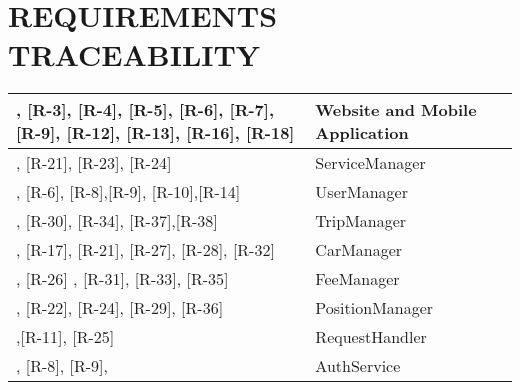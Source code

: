 \section{REQUIREMENTS TRACEABILITY}

	\begin{center}
	\begin{adjustbox}{max width=\textwidth}	
		\begin{tabular}{|l|>{\raggedright}p{5cm}|}
		\hline  [R-2], [R-3], [R-4], [R-5], [R-6], [R-7], [R-9], [R-12], [R-13], [R-16], [R-18]    & Website and Mobile Application \tabularnewline
		 \hline [R-15], [R-21], [R-23], [R-24] & ServiceManager \tabularnewline
		\hline  [R-1], [R-6], [R-8],[R-9], [R-10],[R-14]  & UserManager \tabularnewline
		\hline  [R-19], [R-30], [R-34], [R-37],[R-38]   & TripManager \tabularnewline
		\hline  [R-16], [R-17], [R-21], [R-27], [R-28], [R-32] & CarManager \tabularnewline
		\hline  [R-20], [R-26] , [R-31],  [R-33], [R-35]  & FeeManager \tabularnewline
		\hline  [R-17], [R-22], [R-24], [R-29], [R-36] & PositionManager \tabularnewline
		\hline  [R-7],[R-11], [R-25]& RequestHandler \tabularnewline
		\hline  [R-6], [R-8], [R-9], & AuthService \tabularnewline
		\hline 
		\end{tabular}
	\end{adjustbox}
\end{center}	

